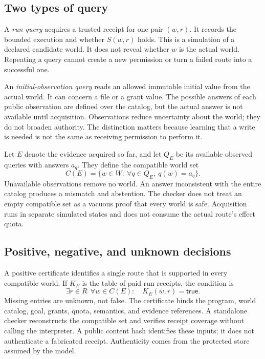 \documentclass[conference]{IEEEtran}
\newcommand{\Yes}{\mathsf{true}}
\begin{document}
\subsection{Two types of query}
A \emph{run query} acquires a trusted receipt for one pair $(w,r)$. It records the bounded execution and whether $S(w,r)$ holds. This is a simulation of a declared candidate world. It does not reveal whether $w$ is the actual world. Repeating a query cannot create a new permission or turn a failed route into a successful one.

An \emph{initial-observation query} reads an allowed immutable initial value from the actual world. It can concern a file or a grant value. The possible answers of each public observation are defined over the catalog, but the actual answer is not available until acquisition. Observations reduce uncertainty about the world; they do not broaden authority. The distinction matters because learning that a write is needed is not the same as receiving permission to perform it.

Let $E$ denote the evidence acquired so far, and let $Q_E$ be its available observed queries with answers $a_q$. They define the compatible world set
\begin{equation}
 C(E)=\{w\in W:\ \forall q\in Q_E,\ q(w)=a_q\}.
 \label{eq:compatible}
\end{equation}
Unavailable observations remove no world. An answer inconsistent with the entire catalog produces a mismatch and abstention. The checker does not treat an empty compatible set as a vacuous proof that every world is safe. Acquisition runs in separate simulated states and does not consume the actual route's effect quota.

\subsection{Positive, negative, and unknown decisions}
A positive certificate identifies a single route that is supported in every compatible world. If $K_E$ is the table of paid run receipts, the condition is
\begin{equation}
 \exists r\in R\ \ \forall w\in C(E):\quad K_E(w,r)=\Yes.
 \label{eq:positive}
\end{equation}
Missing entries are unknown, not false. The certificate binds the program, world catalog, goal, grants, quota, semantics, and evidence references. A standalone checker reconstructs the compatible set and verifies receipt coverage without calling the interpreter. A public content hash identifies these inputs; it does not authenticate a fabricated receipt. Authenticity comes from the protected store assumed by the model.
\end{document}
